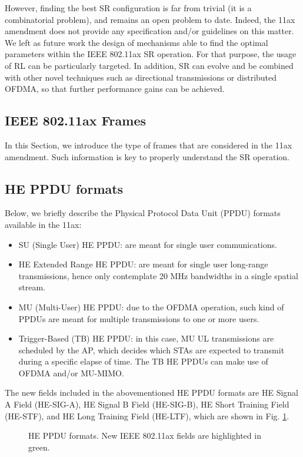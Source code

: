 \documentclass{article}
\begin{document}
However, finding the best SR configuration is far from trivial (it is a combinatorial problem), and remains an open problem to date. Indeed, the 11ax amendment does not provide any specification and/or guidelines on this matter. We left as future work the design of mechanisms able to find the optimal parameters within the IEEE 802.11ax SR operation. For that purpose, the usage of RL can be particularly targeted. In addition, SR can evolve and be combined with other novel techniques such as directional transmissions or distributed OFDMA, so that further performance gains can be achieved.

\begin{appendices}
\section{IEEE 802.11ax Frames}
\label{section:frames}
In this Section, we introduce the type of frames that are considered in the 11ax amendment. Such information is key to properly understand the SR operation.

\subsection{HE PPDU formats}
Below, we briefly describe the Physical Protocol Data Unit (PPDU) formats available in the 11ax:
\begin{itemize}
	\item SU (Single User) HE PPDU: are meant for single user communications.
	\item  HE Extended Range HE PPDU: are meant for single user long-range transmissions, hence only contemplate 20 MHz bandwidths in a single spatial stream.
	\item  MU (Multi-User) HE PPDU: due to the OFDMA operation, such kind of PPDUs are meant for multiple transmissions to one or more users.
	\item Trigger-Based (TB) HE PPDU: in this case, MU UL transmissions are scheduled by the AP, which decides which STAs are expected to transmit during a specific elapse of time. The TB HE PPDUs can make use of OFDMA and/or MU-MIMO.
\end{itemize}

The new fields included in the abovementioned HE PPDU formats are HE Signal A Field (HE-SIG-A), HE Signal B Field (HE-SIG-B), HE Short Training Field (HE-STF), and HE Long Training Field (HE-LTF), which are shown in Fig. \ref{fig:appendix_1}.
\begin{figure}[ht!]
	\centering
	\caption{HE PPDU formats. New IEEE 802.11ax fields are highlighted in green.}
	\label{fig:appendix_1}
\end{figure}


\end{appendices}
\end{document}

